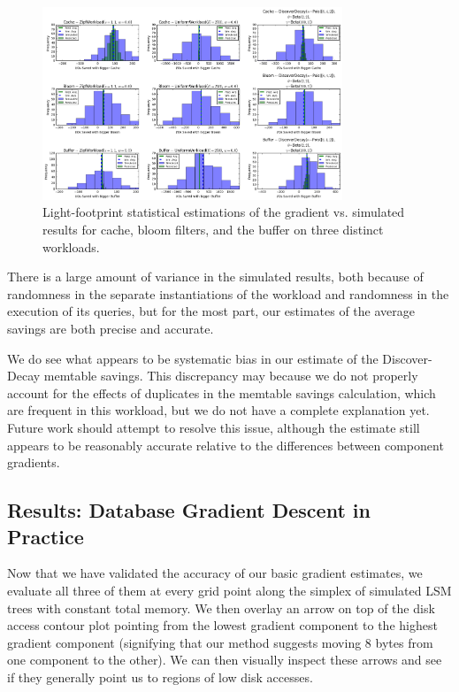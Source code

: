 \documentclass{sig-alternate-05-2015}
\begin{document}
\begin{figure}[!h]
\begin{center}
\includegraphics[width=0.8\textwidth]{all-savings.png}
\end{center}
\caption{Light-footprint statistical estimations of the gradient vs. simulated
results for cache, bloom filters, and the buffer on three distinct workloads.}
\label{fig:savings}
\end{figure}

There is a large amount of variance in the simulated results, both because of
randomness in the separate instantiations of the workload and randomness in
the execution of its queries, but for the most part, our estimates of the average
savings are both precise and accurate.

We do see what appears to be systematic bias in our estimate of the
Discover-Decay memtable savings. This discrepancy may because we do not
properly account for the effects of duplicates in the memtable savings
calculation, which are frequent in this workload, but we do not have a complete
explanation yet. Future work should attempt to resolve this issue, although the
estimate still appears to be reasonably accurate relative to the differences
between component gradients.

\subsection{Results: Database Gradient Descent in Practice}

Now that we have validated the accuracy of our basic gradient estimates, we
evaluate all three of them at every grid point along the simplex of simulated
LSM trees with constant total memory. We then overlay an arrow on top of the
disk access contour plot pointing from the lowest gradient component to the
highest gradient component (signifying that our method suggests moving 8 bytes
from one component to the other). We can then visually inspect these arrows and
see if they generally point us to regions of low disk accesses.
\end{document}
